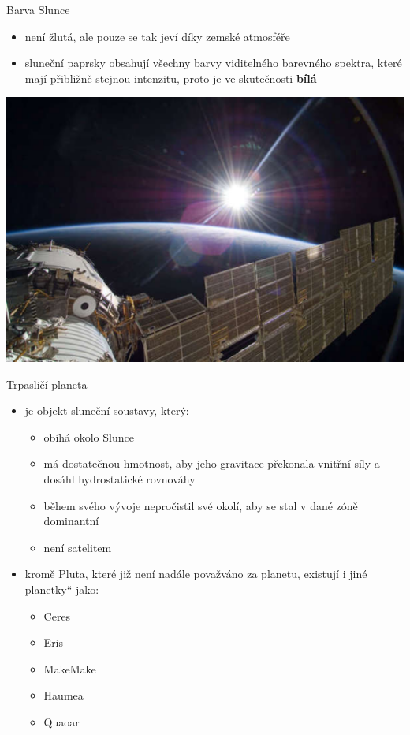 \documentclass[pdf, slideColor]{beamer}
\providecommand{\uv}[1]{\quotedblbase #1\textquotedblleft}
\begin{document}
\begin{frame}{Barva Slunce}
\smallskip
\begin{itemize}
    \item není žlutá, ale pouze se tak jeví díky zemské atmosféře \smallskip
    \item sluneční paprsky obsahují všechny barvy viditelného barevného spektra, které mají přibližně stejnou intenzitu, proto je ve skutečnosti \textbf{bílá}
\end{itemize}
	

\begin{center}
\includegraphics[scale=0.3]{slunce}\\
\end{center}

\end{frame}

\begin{frame}{Trpasličí planeta}
\smallskip
\begin{itemize}
	\item  je objekt sluneční soustavy, který:
	\begin{itemize}
		\item obíhá okolo Slunce
		\item má dostatečnou hmotnost, aby jeho gravitace překonala vnitřní síly a dosáhl hydrostatické rovnováhy
		\item během svého vývoje nepročistil své okolí, aby se stal v dané zóně dominantní
		\item není satelitem
	\end{itemize}
	\item kromě Pluta, které již není nadále považváno za planetu, existují i jiné \uv{planetky} jako: \smallskip
	\begin{itemize}
		\item Ceres
		\item Eris
		\item MakeMake
		\item Haumea
		\item Quaoar
	\end{itemize}
\end{itemize}
\end{frame}
\end{document}
